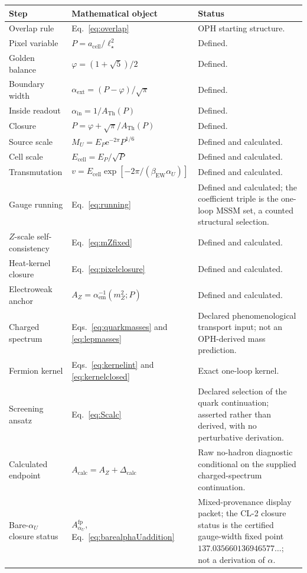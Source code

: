 \documentclass[11pt]{article}
\theoremstyle{remark}
\newcommand{\e}{\mathrm e}
\newcommand{\ATh}{A_{\mathrm{Th}}}
\newcommand{\AZ}{A_Z}
\newcommand{\Dcalc}{\Delta_{\mathrm{calc}}}
\begin{document}
\begin{longtable}{@{}L{0.18\textwidth}L{0.44\textwidth}L{0.28\textwidth}@{}}
\toprule
Step & Mathematical object & Status \\
\midrule
\endhead
Overlap rule & Eq.~\eqref{eq:overlap} & OPH starting structure. \\
Pixel variable & \(P=a_{\mathrm{cell}}/\ell_\star^2\) & Defined. \\
Golden balance & \(\varphi=(1+\sqrt5)/2\) & Defined. \\
Boundary width & \(\alpha_{\mathrm{ext}}=(P-\varphi)/\sqrt\pi\) & Defined. \\
Inside readout & \(\alpha_{\mathrm{in}}=1/\ATh(P)\) & Defined. \\
Closure & \(P=\varphi+\sqrt\pi/\ATh(P)\) & Defined. \\
Source scale & \(M_U=E_P\e^{-2\pi}P^{1/6}\) & Defined and calculated. \\
Cell scale & \(E_{\mathrm{cell}}=E_P/\sqrt P\) & Defined and calculated. \\
Transmutation & \(v=E_{\mathrm{cell}}\exp[-2\pi/(\beta_{\mathrm{EW}}\alpha_U)]\) & Defined and calculated. \\
Gauge running & Eq.~\eqref{eq:running} & Defined and calculated; the coefficient triple is the one-loop MSSM set, a counted structural selection. \\
\(Z\)-scale self-consistency & Eq.~\eqref{eq:mZfixed} & Defined and calculated. \\
Heat-kernel closure & Eq.~\eqref{eq:pixelclosure} & Defined and calculated. \\
Electroweak anchor & \(\AZ=\alpha_{\mathrm{em}}^{-1}(m_Z^2;P)\) & Defined and calculated. \\
Charged spectrum & Eqs.~\eqref{eq:quarkmasses} and \eqref{eq:lepmasses} & Declared phenomenological transport input; not an OPH-derived mass prediction. \\
Fermion kernel & Eqs.~\eqref{eq:kernelint} and \eqref{eq:kernelclosed} & Exact one-loop kernel. \\
Screening ansatz & Eq.~\eqref{eq:Scalc} & Declared selection of the quark continuation; asserted rather than derived, with no perturbative derivation. \\
Calculated endpoint & \(A_{\mathrm{calc}}=\AZ+\Dcalc\) & Raw no-hadron diagnostic conditional on the supplied charged-spectrum continuation. \\
Bare-\(\alpha_U\) closure status & \(A_{\alpha_U}^{\mathrm{fp}}\), Eq.~\eqref{eq:barealphaUaddition} & Mixed-provenance display packet; the CL-2 closure status is the certified gauge-width fixed point \(137.035660136946577\ldots\); not a derivation of \(\alpha\). \\

\end{longtable}
\end{document}

